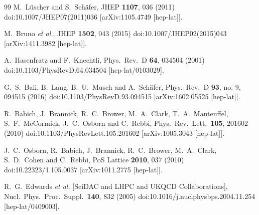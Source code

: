 \begin{thebibliography}{99}
  M.~L{\"u}scher and S.~Sch\"afer,
  JHEP {\bf 1107}, 036 (2011)
  doi:10.1007/JHEP07(2011)036
  [arXiv:1105.4749 [hep-lat]].


  M.~Bruno {\it et al.},
  JHEP {\bf 1502}, 043 (2015)
  doi:10.1007/JHEP02(2015)043
  [arXiv:1411.3982 [hep-lat]].


  A.~Hasenfratz and F.~Knechtli,
  Phys.\ Rev.\ D {\bf 64}, 034504 (2001)
  doi:10.1103/PhysRevD.64.034504
  [hep-lat/0103029].


  G.~S.~Bali, B.~Lang, B.~U.~Musch and A.~Sch\"afer,
  Phys.\ Rev.\ D {\bf 93}, no. 9, 094515 (2016)
  doi:10.1103/PhysRevD.93.094515
  [arXiv:1602.05525 [hep-lat]].


  R.~Babich, J.~Brannick, R.~C.~Brower, M.~A.~Clark, T.~A.~Manteuffel, S.~F.~McCormick, J.~C.~Osborn and C.~Rebbi,
  Phys.\ Rev.\ Lett.\  {\bf 105}, 201602 (2010)
  doi:10.1103/PhysRevLett.105.201602
  [arXiv:1005.3043 [hep-lat]].


  J.~C.~Osborn, R.~Babich, J.~Brannick, R.~C.~Brower, M.~A.~Clark, S.~D.~Cohen and C.~Rebbi,
  PoS Lattice {\bf 2010}, 037 (2010)
  doi:10.22323/1.105.0037
  [arXiv:1011.2775 [hep-lat]].


  R.~G.~Edwards {\it et al.} [SciDAC and LHPC and UKQCD Collaborations],
  Nucl.\ Phys.\ Proc.\ Suppl.\  {\bf 140}, 832 (2005)
  doi:10.1016/j.nuclphysbps.2004.11.254
  [hep-lat/0409003].



\end{thebibliography}
